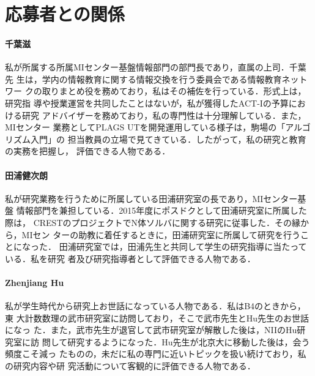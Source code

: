 \documentclass[dvipdfmx]{jsarticle}
\begin{document}
\section*{応募者との関係}
\paragraph{千葉滋}
私が所属する所属MIセンター基盤情報部門の部門長であり，直属の上司．千葉先
生は，学内の情報教育に関する情報交換を行う委員会である情報教育ネットワー
クの取りまとめ役を務めており，私はその補佐を行っている．形式上は，研究指
導や授業運営を共同したことはないが，私が獲得したACT-Iの予算における研究
アドバイザーを務めており，私の専門性は十分理解している．また，MIセンター
業務としてPLAGS UTを開発運用している様子は，駒場の「アルゴリズム入門」の
担当教員の立場で見てきている．したがって，私の研究と教育の実務を把握し，
評価できる人物である．

\paragraph{田浦健次朗}
私が研究業務を行うために所属している田浦研究室の長であり，MIセンター基盤
情報部門を兼担している．2015年度にポスドクとして田浦研究室に所属した際は，
CRESTのプロジェクトでN体ソルバに関する研究に従事した．その縁から，MIセン
ターの助教に着任するときに，田浦研究室に所属して研究を行うことになった．
田浦研究室では，田浦先生と共同して学生の研究指導に当たっている．私を研究
者及び研究指導者として評価できる人物である．

\paragraph{Zhenjiang Hu}
私が学生時代から研究上お世話になっている人物である．私はB4のときから，東
大計数数理の武市研究室に訪問しており，そこで武市先生とHu先生のお世話になっ
た．また，武市先生が退官して武市研究室が解散した後は，NIIのHu研究室に訪
問して研究するようになった．Hu先生が北京大に移動した後は，会う頻度こそ減っ
たものの，未だに私の専門に近いトピックを扱い続けており，私の研究内容や研
究活動について客観的に評価できる人物である．
\end{document}
